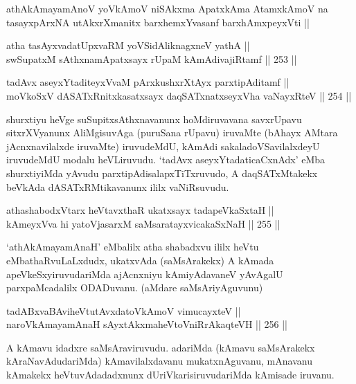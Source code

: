 \begin{shl}
athAkAmayamAnoV yoV\s kAmoV niSAkxma ApatxkAma AtamxkAmoV na tasayxpArxNA utAkxrXmanitx barxhemxYvasanf barxhAmxpeyxVti ||
\end{shl}


\begin{shl}
atha tasAyxvadatUpxvaRM yoVSidAliknagxneV yathA || \\
swSupatxM sAthxnamApatxsayx rUpaM kAmAdivajiRtamf \hfill || 253 ||  
\end{shl}

\begin{shl}
tadAvx aseyxYtaditeyxVvaM pArxkushxrXtAyx parxtipAditamf || \\
moVkoSxV dASATxRnitxkasatxsayx daqSATxnatxseyxVha vaNayxRteV \hfill || 254 ||   
\end{shl}

\begin{artha}
shurxtiyu heVge suSupitxsAthxnavanunx hoMdiruvavana savxrUpavu
sitxrXVyanunx AliMgisuvAga (puruSana rUpavu) iruvaMte (bAhayx AMtara
jAcnxnavilalxde iruvaMte) iruvudeMdU, kAmAdi sakaladoVSavilalxdeyU
iruvudeMdU modalu heVLiruvudu. `tadAvx aseyxYtadaticaCxnAdx' eMba shurxtiyiMda yAvudu
parxtipAdisalapxTiTxruvudo, A daqSATxMtakekx beVkAda dASATxRMtikavanunx ililx vaNiRsuvudu.
\end{artha}

\begin{shl}
athashabodxV\s tarx heVtavxthaR ukatxsayx tadapeVkaSxtaH || \\
kAmeyxVva hi yatoV\s jasarxM saMsaratayxvicakaSxNaH \hfill || 255 ||  
\end{shl}

\begin{artha}
`athAkAmayamAnaH' eMbalilx atha shabadxvu ililx heVtu eMbathaRvuLaLxdudx,
ukatxvAda (saMsArakekx) A kAmada apeVkeSxyiruvudariMda ajAcnxniyu
kAmiyAdavaneV yAvAgalU parxpaMcadalilx ODADuvanu. (aMdare saMsAriyAguvunu)
\end{artha}

\begin{shl}
tadABxvaBAviheVtutAvxdatoV\s kAmoV vimucayxteV ||  \\
naroV\s kAmayamAnaH sAyxtAkxmaheVtoVniRrAkaqteVH \hfill || 256 ||  
\end{shl}

\begin{artha}
A kAmavu idadxre saMsAraviruvudu. adariMda (kAmavu saMsArakekx
kAraNavAdudariMda) kAmavilalxdavanu mukatxnAguvanu, mAnavanu kAmakekx
heVtuvAdadadxnunx dUriVkarisiruvudariMda kAmisade iruvanu.
\end{artha}

